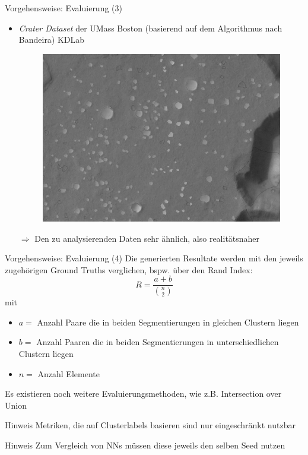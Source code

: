 \documentclass[9pt]{beamer}
\begin{document}
\begin{frame}{Vorgehensweise: Evaluierung (3)}
\begin{itemize}
	\item \textit{Crater Dataset} der UMass Boston (basierend auf dem Algorithmus nach Bandeira)
	 KDLab\footnotemark[1]
	 \begin{figure}[H]
	 	\includegraphics[width=.7\textwidth,keepaspectratio]{bandeira_detected.png}
	 \end{figure}
	\item[$\Rightarrow$] Den zu analysierenden Daten sehr ähnlich, also realitätsnaher
\end{itemize}
\end{frame}

\begin{frame}{Vorgehensweise: Evaluierung (4)}
Die generierten Resultate werden mit den jeweils zugehörigen Ground Truths verglichen, bspw. über den Rand Index:
\[R = \frac{a+b}{\binom{n}{2}}\]
mit
\begin{itemize}
	\item{$a=$} Anzahl Paare die in beiden Segmentierungen in gleichen Clustern liegen
	\item{$b=$} Anzahl Paaren die in beiden Segmentierungen in unterschiedlichen Clustern liegen
	\item{$n=$} Anzahl Elemente
\end{itemize}
\bigskip
Es existieren noch weitere Evaluierungsmethoden, wie z.B. Intersection over Union
\pause
\bigskip
\begin{block}{Hinweis}
	Metriken, die auf Clusterlabels basieren sind nur eingeschränkt nutzbar
\end{block}
\pause
\bigskip
\begin{block}{Hinweis}
	Zum Vergleich von NNs müssen diese jeweils den selben Seed nutzen
\end{block}
\end{frame}
\end{document}
